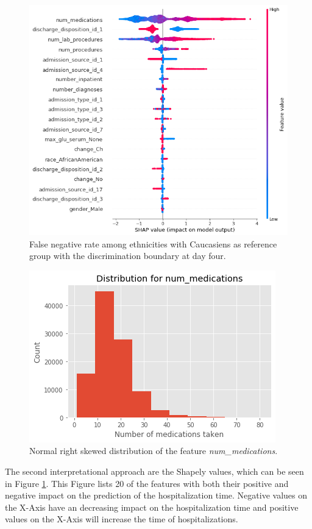\documentclass[journal]{IEEEtran}
\begin{document}
\begin{figure}
	\centering
	\includegraphics[width=1\linewidth]{../imgs/shap_paper}
	\caption{False negative rate among ethnicities with Caucasiens as reference group with the discrimination boundary at day four.}
	\label{fig:shap}
\end{figure}

\begin{figure}
	\centering
	\includegraphics[width=0.9\linewidth]{../imgs/meds_dist}
	\caption{Normal right skewed distribution of the feature \textit{num\_medications}.}
	\label{fig:num_meds}
\end{figure}

The second interpretational approach are the Shapely values, which can be seen in Figure \ref{fig:shap}. This Figure lists 20 of the features with both their positive and negative impact on the prediction of the hospitalization time. Negative values on the X-Axis have an decreasing impact on the hospitalization time and positive values on the X-Axis will increase the time of hospitalizations.
\end{document}
